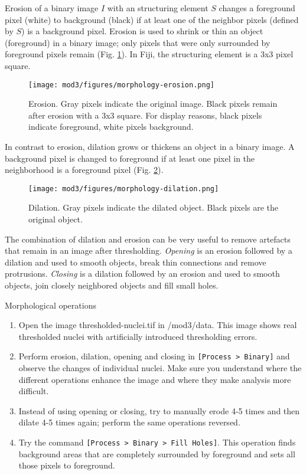 Erosion of a binary image $I$ with an structuring element $S$ changes a foreground pixel (white) to background (black) if at least one of the neighbor pixels (defined by $S$) is a background pixel. Erosion is used to shrink or thin an object (foreground) in a binary image; only pixels that were only surrounded by foreground pixels remain (Fig. \ref{fig:morphology-erosion}). In Fiji, the structuring element is a 3x3 pixel square. 

\begin{figure}[!ht]
	\centering
		\texttt{[image: mod3/figures/morphology-erosion.png]}
	\caption{Erosion. Gray pixels indicate the original image. Black pixels remain after erosion with a 3x3 square. For display reasons, black pixels indicate foreground, white pixels background.}
	\label{fig:morphology-erosion}
\end{figure}

In contrast to erosion, dilation grows or thickens an object in a binary image. A background pixel is changed to foreground if at least one pixel in the neighborhood is a foreground pixel (Fig. \ref{fig:morphology-dilation}). 

\begin{figure}[!ht]
	\centering
		\texttt{[image: mod3/figures/morphology-dilation.png]}
	\caption{Dilation. Gray pixels indicate the dilated object. Black pixels are the original object.}
	\label{fig:morphology-dilation}
\end{figure}

The combination of dilation and erosion can be very useful to remove artefacts that remain in an image after thresholding. \emph{Opening} is an erosion followed by a dilation and used to smooth objects, break thin connections and remove protrusions. \emph{Closing} is a dilation followed by an erosion and used to smooth objects, join closely neighbored objects and fill small holes. 

\begin{taskbox}{Morphological operations}
\begin{enumerate}
	\item Open the image thresholded-nuclei.tif in /mod3/data. This image shows real thresholded nuclei with artificially introduced thresholding errors. 
	\item Perform erosion, dilation, opening and closing in \texttt{[Process > Binary]} and observe the changes of individual nuclei. Make sure you understand where the different operations enhance the image and where they make analysis more difficult.
	\item Instead of using opening or closing, try to manually erode 4-5 times and then dilate 4-5 times again; perform the same operations reversed. 
	\item Try the command \texttt{[Process > Binary > Fill Holes]}. This operation finds background areas that are completely surrounded by foreground and sets all those pixels to foreground.
	\end{enumerate}
\end{taskbox}

